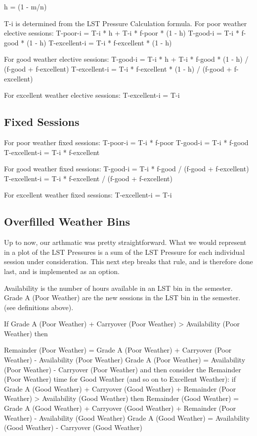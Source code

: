 \documentclass{article}
\begin{document}
h = (1 - m/n)

T-i is determined from the LST Pressure Calculation formula. For poor weather elective sessions: T-poor-i = T-i * h + T-i * f-poor * (1 - h) T-good-i = T-i * f-good * (1 - h) T-excellent-i = T-i * f-excellent * (1 - h)

For good weather elective sessions: T-good-i = T-i * h + T-i * f-good * (1 - h) / (f-good + f-excellent) T-excellent-i = T-i * f-excellent * (1 - h) / (f-good + f-excellent)

For excellent weather elective sessions: T-excellent-i = T-i 

\subsection{Fixed Sessions}

For poor weather fixed sessions: T-poor-i = T-i * f-poor T-good-i = T-i * f-good T-excellent-i = T-i * f-excellent

For good weather fixed sessions: T-good-i = T-i * f-good / (f-good + f-excellent) T-excellent-i = T-i * f-excellent / (f-good + f-excellent)

For excellent weather fixed sessions: T-excellent-i = T-i

\subsection{Overfilled Weather Bins}

Up to now, our arthmatic was pretty straightforward.  What we would represent in a plot of the LST Pressures is a sum of the LST Pressure for each individual session under consideration. This next step breaks that rule, and is therefore done last, and is implemented as an option.

Availability is the number of hours available in an LST bin in the semester. Grade A (Poor Weather) are the new sessions in the LST bin in the semester. (see definitions above).

If Grade A (Poor Weather) + Carryover (Poor Weather) > Availability (Poor Weather) then

    Remainder (Poor Weather) = Grade A (Poor Weather) + Carryover (Poor Weather) - Availability (Poor Weather)
    Grade A (Poor Weather) = Availability (Poor Weather) - Carryover (Poor Weather)
    and then consider the Remainder (Poor Weather) time for Good Weather (and so on to Excellent Weather):
    if Grade A (Good Weather) + Carryover (Good Weather) + Remainder (Poor Weather) > Availability (Good Weather) then
        Remainder (Good Weather) = Grade A (Good Weather) + Carryover (Good Weather) + Remainder (Poor Weather) - Availability (Good Weather)
        Grade A (Good Weather) = Availability (Good Weather) - Carryover (Good Weather) 
\end{document}
